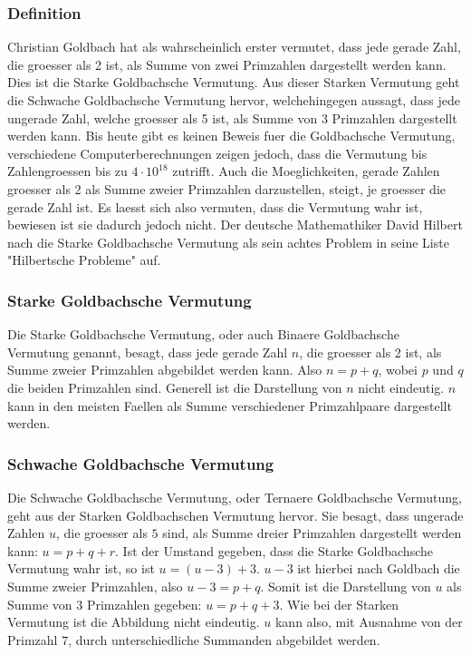 \subsubsection{Definition}
Christian Goldbach hat als wahrscheinlich erster vermutet, dass jede gerade Zahl, die groesser als 2 ist, als Summe von zwei Primzahlen dargestellt werden kann. Dies ist die Starke Goldbachsche Vermutung. Aus dieser Starken Vermutung geht die Schwache Goldbachsche Vermutung hervor, welchehingegen aussagt, dass jede ungerade Zahl, welche groesser als 5 ist, als Summe von 3 Primzahlen dargestellt werden kann. Bis heute gibt es keinen Beweis fuer die Goldbachsche Vermutung, verschiedene Computerberechnungen zeigen jedoch, dass die Vermutung  bis Zahlengroessen bis zu $4\cdot10^{18}$ zutrifft. Auch die Moeglichkeiten, gerade Zahlen groesser als 2 als Summe zweier Primzahlen darzustellen, steigt, je groesser die gerade Zahl ist. Es laesst sich also vermuten, dass die Vermutung wahr ist, bewiesen ist sie dadurch jedoch nicht. Der deutsche Mathemathiker David Hilbert nach die Starke Goldbachsche Vermutung als sein achtes Problem in seine Liste "Hilbertsche Probleme" auf.
\subsubsection{Starke Goldbachsche Vermutung}
Die Starke Goldbachsche Vermutung, oder auch Binaere Goldbachsche Vermutung genannt, besagt, dass jede gerade Zahl $n$, die groesser als 2 ist, als Summe zweier Primzahlen abgebildet werden kann. Also $n = p + q$, wobei $p$ und $q$ die beiden Primzahlen sind. Generell ist die Darstellung von $n$ nicht eindeutig. $n$ kann in den meisten Faellen als Summe verschiedener Primzahlpaare dargestellt werden.
\subsubsection{Schwache Goldbachsche Vermutung}
Die Schwache Goldbachsche Vermutung, oder Ternaere Goldbachsche Vermutung, geht aus der Starken Goldbachschen Vermutung hervor. Sie besagt, dass ungerade Zahlen $u$, die groesser als $5$ sind, als Summe dreier Primzahlen dargestellt werden kann: $u = p + q + r$. Ist der Umstand gegeben, dass die Starke Goldbachsche Vermutung wahr ist, so ist $u = (u - 3) + 3$. $u - 3$ ist hierbei nach Goldbach die Summe zweier Primzahlen, also $u - 3 = p + q$. Somit ist die Darstellung von $u$ als Summe von 3 Primzahlen gegeben: $u = p + q + 3$. Wie bei der Starken Vermutung ist die Abbildung nicht eindeutig. $u$ kann also, mit Ausnahme von der Primzahl $7$, durch unterschiedliche Summanden abgebildet werden.
